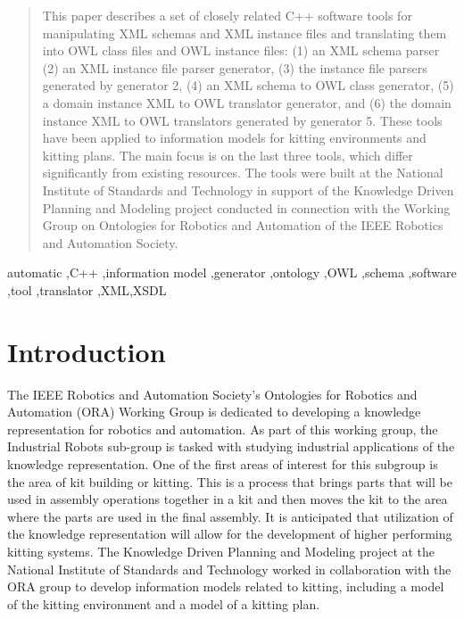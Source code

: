 \documentclass[preprint,12pt]{elsarticle}
\begin{document}
\begin{frontmatter}
\begin{abstract}
This paper describes a set of closely related C++ software tools for
manipulating XML schemas and XML instance files and translating them into
OWL class files and OWL instance files: (1) an XML schema parser (2) an XML
instance file parser generator, (3) the instance file parsers generated by
generator 2, (4) an XML schema to OWL class generator, (5) a domain
instance XML to OWL translator generator, and (6) the domain instance XML
to OWL translators generated by generator 5. These tools have been applied
to information models for kitting environments and kitting plans. The main
focus is on the last three tools, which differ significantly from existing
resources. The tools were built at the National Institute of Standards and
Technology in support of the Knowledge Driven Planning and Modeling project
conducted in connection with the Working Group on Ontologies for Robotics
and Automation of the IEEE Robotics and Automation Society.
\end{abstract}

\begin{keyword}
automatic \sep C++ \sep information model \sep generator \sep ontology \sep OWL \sep schema \sep software \sep tool \sep translator \sep XML\sep XSDL

\end{keyword}

\end{frontmatter}


\section{Introduction}
\label{}

The IEEE Robotics and Automation Society's Ontologies for Robotics
and Automation (ORA) Working Group is dedicated to developing a knowledge
representation for robotics and automation. As part of this working group,
the Industrial Robots sub-group is tasked with studying industrial
applications of the knowledge representation. One of the first areas of
interest for this subgroup is the area of kit building or kitting. This is
a process that brings parts that will be used in assembly operations
together in a kit and then moves the kit to the area where the parts are
used in the final assembly. It is anticipated that utilization of the
knowledge representation will allow for the development of higher
performing kitting systems. The Knowledge Driven Planning and Modeling
project at the National Institute of Standards and Technology worked in
collaboration with the ORA group to develop information models related to
kitting, including a model of the kitting environment and a model of a
kitting plan.
\end{document}
